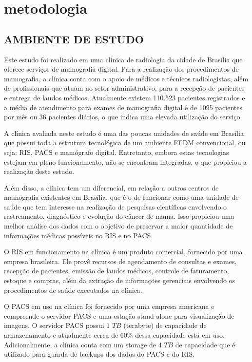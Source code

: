 \chapter[METODOLOGIA]{\textbf {metodologia}}

\section[AMBIENTE DE ESTUDO]{AMBIENTE DE ESTUDO}
Este estudo foi realizado em uma clínica de radiologia da cidade de Brasília que oferece
serviços de mamografia digital. Para a realização dos procedimentos de mamografia, a
clínica conta com o apoio de médicos e técnicos radiologistas, além de profissionais que
atuam no setor administrativo, para a recepção de pacientes e entrega de laudos médicos.
Atualmente existem 110.523 pacientes registrados e a média de atendimento para exames
de mamografia digital é de 1095 pacientes por mês ou 36 pacientes diários, o que indica
uma elevada utilização do serviço.

A clínica avaliada neste estudo é uma das poucas unidades de saúde em Brasília que
possui toda a estrutura tecnológica de um ambiente FFDM convencional, ou seja: RIS,
PACS e mamógrafo digital. Entretanto, embora estas tecnologias estejam em pleno
funcionamento, não se encontram integradas, o que propiciou a realização deste estudo.

Além disso, a clínica tem um diferencial, em relação a outros centros de mamografia
existentes em Brasília, que é o de funcionar como uma unidade de saúde que tem interesse
na realização de pesquisas científicas envolvendo o rastreamento, diagnóstico e evolução
do câncer de mama. Isso propiciou uma melhor análise dos dados com o objetivo de
preservar a maior quantidade de informações médicas possíveis no RIS e no PACS.

O RIS em funcionamento na clínica é um produto comercial, fornecido por uma
empresa brasileira. Ele provê recursos de agendamento de consultas e exames, recepção de
pacientes, emissão de laudos médicos, controle de faturamento, estoque e compras, além
da extração de informações gerenciais envolvendo os procedimentos de saúde executados
na clínica.

O PACS em uso na clínica foi fornecido por uma empresa americana e compreende o
servidor PACS e uma estação stand-alone para visualização de imagens. O servidor PACS
possui $1$ $TB$ (terabyte) de capacidade de armazenamento e atualmente cerca de $60\%$ dessa
capacidade está em uso. Adicionalmente, a clínica conta com um storage de $4$ $TB$ de
capacidade que é utilizado para guarda de backups dos dados do PACS e do RIS.

